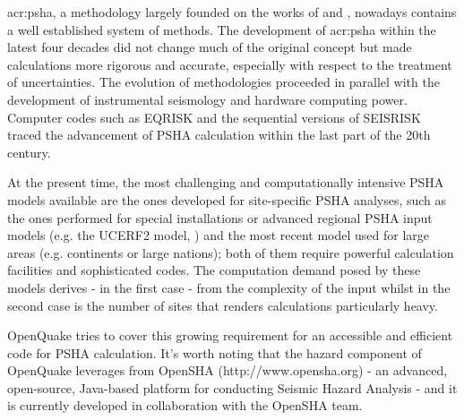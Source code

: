 \gls{acr:psha}, a methodology largely founded on the works of 
\citet{cornell1968} and \citet{esteva1968}, nowadays contains a well
established system of methods. 
%
The development of \gls{acr:psha} within the latest four decades did not 
change much of the original concept but made calculations more rigorous 
and accurate, especially with respect to the treatment of uncertainties. 
%
The evolution of methodologies proceeded in parallel with the development 
of instrumental seismology and hardware computing power. Computer codes 
such as EQRISK \citep{mcguire1976} and the sequential versions of SEISRISK
\citep{bender1982,bender1987} traced the advancement of PSHA calculation 
within the last part of the 20th century.

At the present time, the most challenging and computationally intensive 
PSHA models available are the ones developed for site-specific PSHA analyses, 
such as the ones performed for special installations or advanced regional 
PSHA input models (e.g. the UCERF2 model, \citet{field2009}) and the most  
recent model used for large areas (e.g. continents or large nations); both of them 
require powerful calculation facilities and sophisticated codes.
%
The computation demand posed by these models derives - in the first case - 
from the complexity of the input whilst in the second case is the number 
of sites that renders calculations particularly heavy.  

OpenQuake tries to cover this growing requirement for an accessible and 
efficient code for PSHA calculation. It's worth noting that the hazard 
component of OpenQuake leverages from OpenSHA (http://www.opensha.org) - 
an advanced, open-source, Java-based platform for conducting Seismic 
Hazard Analysis - and it is currently developed in collaboration with 
the OpenSHA team.  
%
